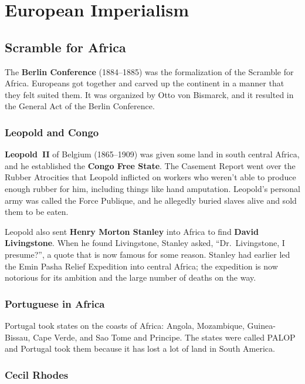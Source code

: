 
\section{European Imperialism}

\subsection*{Scramble for Africa}

The \textbf{Berlin Conference} (1884--1885) was the formalization of the Scramble for Africa.
Europeans got together and carved up the continent in a manner that they felt suited them.
It was organized by Otto von Bismarck, and it resulted in the General Act of the Berlin Conference.

\subsubsection*{Leopold and Congo}

\textbf{Leopold~II} of Belgium (1865--1909) was given some land in south central Africa,
and he established the \textbf{Congo Free State}.
The Casement Report went over the Rubber Atrocities that Leopold inflicted
on workers who weren't able to produce enough rubber for him, including things like hand amputation.
Leopold's personal army was called the Force Publique,
and he allegedly buried slaves alive and sold them to be eaten.

Leopold also sent \textbf{Henry Morton Stanley} into Africa to find \textbf{David Livingstone}.
When he found Livingstone, Stanley asked, ``Dr.\ Livingstone, I presume?'', a quote that is now famous for some reason.
Stanley had earlier led the Emin Pasha Relief Expedition into central Africa;
the expedition is now notorious for its ambition and the large number of deaths on the way.

\subsubsection*{Portuguese in Africa}

Portugal took states on the coasts of Africa:
Angola,
Mozambique,
Guinea-Bissau,
Cape Verde,
and Sao Tome and Principe.
The states were called PALOP and Portugal took them because it has lost a lot of land in South America.

\subsubsection*{Cecil Rhodes}

